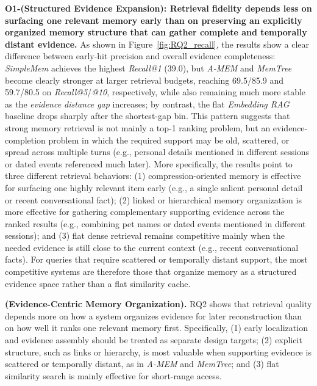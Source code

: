 \noindent \textbf{O1-(Structured Evidence Expansion): Retrieval fidelity depends less on surfacing one relevant memory early than on preserving an explicitly organized memory structure that can gather complete and temporally distant evidence.}
As shown in Figure~\ref{fig:RQ2_recall}, the results show a clear difference between early-hit precision and overall evidence completeness: \textit{SimpleMem} achieves the highest \textit{Recall@1} (39.0), but \textit{A-MEM} and \textit{MemTree} become clearly stronger at larger retrieval budgets, reaching 69.5/85.9 and 59.7/80.5 on \textit{Recall@5}/\textit{@10}, respectively, while also remaining much more stable as the \textit{evidence distance gap} increases; by contrast, the flat \textit{Embedding RAG} baseline drops sharply after the shortest-gap bin.
This pattern suggests that strong memory retrieval is not mainly a top-1 ranking problem, but an evidence-completion problem in which the required support may be old, scattered, or spread across multiple turns (e.g., personal details mentioned in different sessions or dated events referenced much later).
More specifically, the results point to three different retrieval behaviors:
(1) compression-oriented memory is effective for surfacing one highly relevant item early (e.g., a single salient personal detail or recent conversational fact);
(2) linked or hierarchical memory organization is more effective for gathering complementary supporting evidence across the ranked results (e.g., combining pet names or dated events mentioned in different sessions);
and (3) flat dense retrieval remains competitive mainly when the needed evidence is still close to the current context (e.g., recent conversational facts).
For queries that require scattered or temporally distant support, the most competitive systems are therefore those that organize memory as a structured evidence space rather than a flat similarity cache.

\begin{findingbox}
\textbf{(Evidence-Centric Memory Organization).} RQ2 shows that retrieval quality depends more on how a system organizes evidence for later reconstruction than on how well it ranks one relevant memory first.
Specifically, (1) early localization and evidence assembly should be treated as separate design targets;
(2) explicit structure, such as links or hierarchy, is most valuable when supporting evidence is scattered or temporally distant, as in \textit{A-MEM} and \textit{MemTree};
and (3) flat similarity search is mainly effective for short-range access. 
\end{findingbox}

